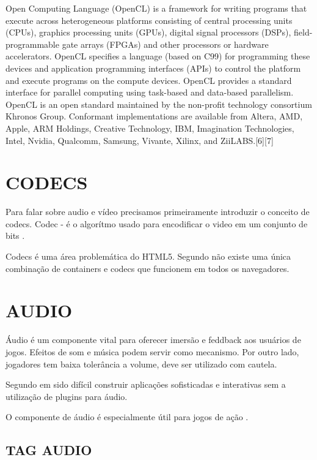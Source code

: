 Open Computing Language (OpenCL) is a framework for writing programs that execute across heterogeneous platforms consisting of central processing units (CPUs), graphics processing units (GPUs), digital signal processors (DSPs), field-programmable gate arrays (FPGAs) and other processors or hardware accelerators. OpenCL specifies a language (based on C99) for programming these devices and application programming interfaces (APIs) to control the platform and execute programs on the compute devices. OpenCL provides a standard interface for parallel computing using task-based and data-based parallelism. OpenCL is an open standard maintained by the non-profit technology consortium Khronos Group. Conformant implementations are available from Altera, AMD, Apple, ARM Holdings, Creative Technology, IBM, Imagination Technologies, Intel, Nvidia, Qualcomm, Samsung, Vivante, Xilinx, and ZiiLABS.[6][7]


\section{CODECS}
Para falar sobre audio e vídeo precisamos primeiramente introduzir o conceito de codecs. Codec - é o algorítmo usado para encodificar o video em um conjunto de bits \cite{diveIntohtml}.

Codecs é uma área problemática do HTML5. Segundo \cite{diveIntohtml} não existe uma única combinação de containers e codecs que funcionem em todos os navegadores.

\section{AUDIO}
Áudio é um componente vital para oferecer imersão e feddback aos
usuários de jogos. Efeitos de som e música podem servir como mecanismo. 
Por outro lado, jogadores tem baixa tolerância a volume, deve ser utilizado com cautela.

Segundo \cite{browserGamesTechnologyAndFuture} em sido difícil construir aplicações sofisticadas e interativas sem a utilização de plugins para áudio.

O componente de áudio é especialmente útil para jogos de ação \autocite{browserGamesTechnologyAndFuture}.

\subsection{TAG AUDIO}

